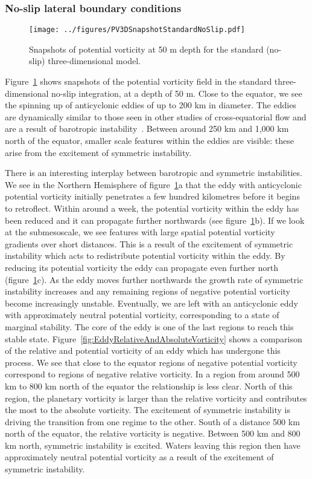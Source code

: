 \subsubsection{No-slip lateral boundary conditions}
\begin{figure}[p]
    \centering
    \texttt{[image: ../figures/PV3DSnapshotStandardNoSlip.pdf]}
    \caption{Snapshots of potential vorticity at 50 m depth for the standard (no-slip) three-dimensional model.}
    \label{fig:PVStandardNoSlip3D}
\end{figure}
Figure~\ref{fig:PVStandardNoSlip3D} shows snapshots of the potential vorticity field in the standard three-dimensional no-slip integration, at a depth of 50 m. Close to the equator, we see the spinning up of anticyclonic eddies of up to 200 km in diameter. The eddies are dynamically similar to those seen in other studies of cross-equatorial flow and are a result of barotropic instability~\citep[e.g.][]{Edwards1998I, Edwards1998II, Jochum2003, Goes2009}. Between around 250 km and 1,000 km north of the equator, smaller scale features within the eddies are visible: these arise from the excitement of symmetric instability.

There is an interesting interplay between barotropic and symmetric instabilities. We see in the Northern Hemisphere of figure~\ref{fig:PVStandardNoSlip3D}a that the eddy with anticyclonic potential vorticity initially penetrates a few hundred kilometres before it begins to retroflect. Within around a week, the potential vorticity within the eddy has been reduced and it can propagate further northwards (see figure~\ref{fig:PVStandardNoSlip3D}b). If we look at the submesoscale, we see features with large spatial potential vorticity gradients over short distances. This is a result of the excitement of symmetric instability which acts to redistribute potential vorticity within the eddy. By reducing its potential vorticity the eddy can propagate even further north (figure~\ref{fig:PVStandardNoSlip3D}c). As the eddy moves further northwards the growth rate of symmetric instability increases and any remaining regions of negative potential vorticity become increasingly unstable. Eventually, we are left with an anticyclonic eddy with approximately neutral potential vorticity, corresponding to a state of marginal stability. The core of the eddy is one of the last regions to reach this stable state. Figure~\ref{fig:EddyRelativeAndAbsoluteVorticity} shows a comparison of the relative and potential vorticity of an eddy which has undergone this process. We see that close to the equator regions of negative potential vorticity correspond to regions of negative relative vorticity. In a region from around 500 km to 800 km north of the equator the relationship is less clear. North of this region, the planetary vorticity is larger than the relative vorticity and contributes the most to the absolute vorticity. The excitement of symmetric instability is driving the transition from one regime to the other. South of a distance 500 km north of the equator, the relative vorticity is negative. Between 500 km and 800 km north, symmetric instability is excited. Waters leaving this region then have approximately neutral potential vorticity as a result of the excitement of symmetric instability.


